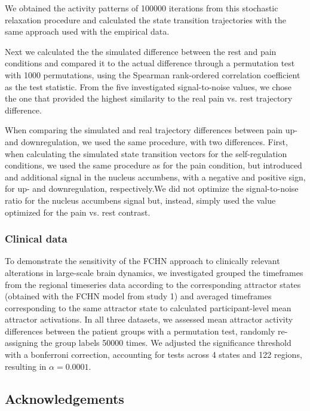 \documentclass{article}
\begin{document}
We obtained the activity patterns of 100000 iterations from this stochastic relaxation procedure and calculated the state transition trajectories with the same approach used with the empirical data.

Next we calculated the the simulated difference between the rest and pain conditions and compared it to the actual difference through a permutation test with 1000 permutations, using the Spearman rank-ordered correlation coefficient as the test statistic.
From the five investigated signal-to-noise values, we chose the one that provided the highest similarity to the real pain vs. rest trajectory difference.

When comparing the simulated and real trajectory differences between pain up- and downregulation, we used the same procedure, with two differences. First, when calculating the simulated state transition vectors for the self-regulation conditions, we used the same procedure as for the pain condition, but introduced and additional signal in the nucleus accumbens, with a negative and positive sign, for  up- and downregulation, respectively.We did not optimize the signal-to-noise ratio for the nucleus accumbens signal but, instead, simply used the value optimized for the pain vs. rest contrast.

\subsubsection{Clinical data}\label{Clinical data}

To demonstrate the sensitivity of the FCHN approach to clinically relevant alterations in large-scale brain dynamics, we investigated grouped the timeframes from the regional timeseries data according to the corresponding attractor states (obtained with the FCHN model from study 1) and averaged timeframes corresponding to the same attractor state to calculated participant-level mean attractor activations.
In all three datasets, we assessed mean attractor activity differences between the patient groups with a permutation test, randomly re-assigning the group labels 50000 times.
We adjusted the significance threshold with a bonferroni correction, accounting for tests across 4 states and 122 regions, resulting in $\alpha = 0.0001$.

\subsection{Acknowledgements}\label{Acknowledgements}
\end{document}
